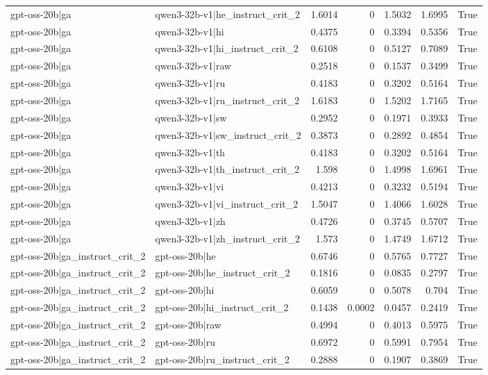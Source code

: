 \begin{table}
\begin{tabular}{l l r r r r l}
gpt-oss-20b|ga & qwen3-32b-v1|he_instruct_crit_2 & 1.6014 & 0 & 1.5032 & 1.6995 & True \\
gpt-oss-20b|ga & qwen3-32b-v1|hi & 0.4375 & 0 & 0.3394 & 0.5356 & True \\
gpt-oss-20b|ga & qwen3-32b-v1|hi_instruct_crit_2 & 0.6108 & 0 & 0.5127 & 0.7089 & True \\
gpt-oss-20b|ga & qwen3-32b-v1|raw & 0.2518 & 0 & 0.1537 & 0.3499 & True \\
gpt-oss-20b|ga & qwen3-32b-v1|ru & 0.4183 & 0 & 0.3202 & 0.5164 & True \\
gpt-oss-20b|ga & qwen3-32b-v1|ru_instruct_crit_2 & 1.6183 & 0 & 1.5202 & 1.7165 & True \\
gpt-oss-20b|ga & qwen3-32b-v1|sw & 0.2952 & 0 & 0.1971 & 0.3933 & True \\
gpt-oss-20b|ga & qwen3-32b-v1|sw_instruct_crit_2 & 0.3873 & 0 & 0.2892 & 0.4854 & True \\
gpt-oss-20b|ga & qwen3-32b-v1|th & 0.4183 & 0 & 0.3202 & 0.5164 & True \\
gpt-oss-20b|ga & qwen3-32b-v1|th_instruct_crit_2 & 1.598 & 0 & 1.4998 & 1.6961 & True \\
gpt-oss-20b|ga & qwen3-32b-v1|vi & 0.4213 & 0 & 0.3232 & 0.5194 & True \\
gpt-oss-20b|ga & qwen3-32b-v1|vi_instruct_crit_2 & 1.5047 & 0 & 1.4066 & 1.6028 & True \\
gpt-oss-20b|ga & qwen3-32b-v1|zh & 0.4726 & 0 & 0.3745 & 0.5707 & True \\
gpt-oss-20b|ga & qwen3-32b-v1|zh_instruct_crit_2 & 1.573 & 0 & 1.4749 & 1.6712 & True \\
gpt-oss-20b|ga_instruct_crit_2 & gpt-oss-20b|he & 0.6746 & 0 & 0.5765 & 0.7727 & True \\
gpt-oss-20b|ga_instruct_crit_2 & gpt-oss-20b|he_instruct_crit_2 & 0.1816 & 0 & 0.0835 & 0.2797 & True \\
gpt-oss-20b|ga_instruct_crit_2 & gpt-oss-20b|hi & 0.6059 & 0 & 0.5078 & 0.704 & True \\
gpt-oss-20b|ga_instruct_crit_2 & gpt-oss-20b|hi_instruct_crit_2 & 0.1438 & 0.0002 & 0.0457 & 0.2419 & True \\
gpt-oss-20b|ga_instruct_crit_2 & gpt-oss-20b|raw & 0.4994 & 0 & 0.4013 & 0.5975 & True \\
gpt-oss-20b|ga_instruct_crit_2 & gpt-oss-20b|ru & 0.6972 & 0 & 0.5991 & 0.7954 & True \\
gpt-oss-20b|ga_instruct_crit_2 & gpt-oss-20b|ru_instruct_crit_2 & 0.2888 & 0 & 0.1907 & 0.3869 & True \\

\end{tabular}
\end{table}
